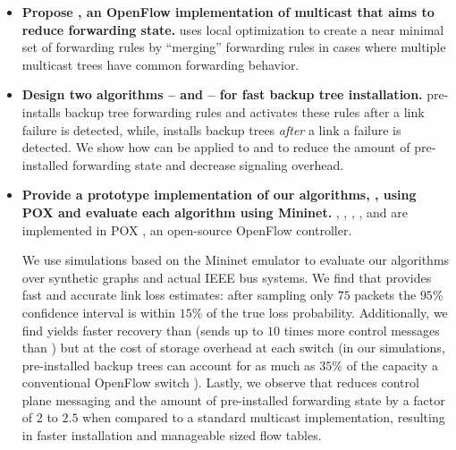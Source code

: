 \begin{itemize}
	\item {\bf Propose \merges, an OpenFlow implementation of multicast that aims to reduce forwarding state.}  \merge uses local optimization to create a near minimal set of forwarding rules 
	by ``merging'' forwarding rules in cases where multiple multicast trees have common forwarding behavior.

	\item {\bf Design two algorithms -- \pre and \post -- for fast backup tree installation.}  \pre pre-installs backup tree forwarding rules and
	activates these rules after a link failure is detected, while, \post installs backup trees \emph{after} a link a failure is detected.  
	We show how \merge can be applied to \pre and \post to reduce the amount of \pre pre-installed forwarding state and decrease \post signaling overhead. 

	\item {\bf Provide a prototype implementation of our algorithms, \mdrs, using POX and 
	evaluate each algorithm using Mininet.} \pcnts, \steiners, \merges, \pres, and \post are implemented in POX \cite{Pox}, 
	an open-source OpenFlow controller. 
	
	We use simulations based on the Mininet emulator \cite{Lantz10} to evaluate our algorithms over synthetic graphs and actual IEEE bus systems.
	We find that \pcnt provides fast and accurate link loss estimates: after sampling only $75$ packets
	the $95\%$ confidence interval is within $15\%$ of the true loss probability.  Additionally, we find \pre yields faster recovery than \post 
	(\post sends up to $10$ times more control messages than \pres) but at the cost of storage overhead at each switch (in our simulations, pre-installed backup trees can account for as much
	as $35\%$ of the capacity a conventional OpenFlow switch \cite{Curtis11}).
	Lastly, we observe that \merge reduces control plane messaging and the amount of pre-installed forwarding state by a factor of $2$ to $2.5$ when compared to a standard multicast
	implementation, resulting in faster installation and manageable sized flow tables.


		
\end{itemize}

